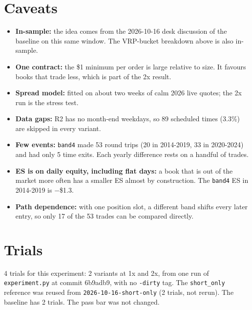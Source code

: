 \documentclass{article}
\begin{document}
\section{Caveats}

\begin{itemize}

\item \textbf{In-sample:} the idea comes from the 2026-10-16 desk discussion of the baseline on this same window. The VRP-bucket breakdown above is also in-sample.

\item \textbf{One contract:} the \$1 minimum per order is large relative to size. It favours books that trade less, which is part of the 2x result.

\item \textbf{Spread model:} fitted on about two weeks of calm 2026 live quotes; the 2x run is the stress test.

\item \textbf{Data gaps:} R2 has no month-end weekdays, so 89 scheduled times (3.3\%) are skipped in every variant.

\item \textbf{Few events:} \texttt{band4} made 53 round trips (20 in 2014-2019, 33 in 2020-2024) and had only 5 time exits. Each yearly difference rests on a handful of trades.

\item \textbf{ES is on daily equity, including flat days:} a book that is out of the market more often has a smaller ES almost by construction. The \texttt{band4} ES in 2014-2019 is \ensuremath{-}\$1.3.

\item \textbf{Path dependence:} with one position slot, a different band shifts every later entry, so only 17 of the 53 trades can be compared directly.

\end{itemize}

\section{Trials}

4 trials for this experiment: 2 variants at 1x and 2x, from one run of \texttt{experiment.\allowbreak{}py} at commit 6b9adb9, with no \texttt{-\allowbreak{}dirty} tag. The \texttt{short\_\allowbreak{}only} reference was reused from \texttt{2026-\allowbreak{}10-\allowbreak{}16-\allowbreak{}short-\allowbreak{}only} (2 trials, not rerun). The baseline has 2 trials. The pass bar was not changed.
\end{document}
